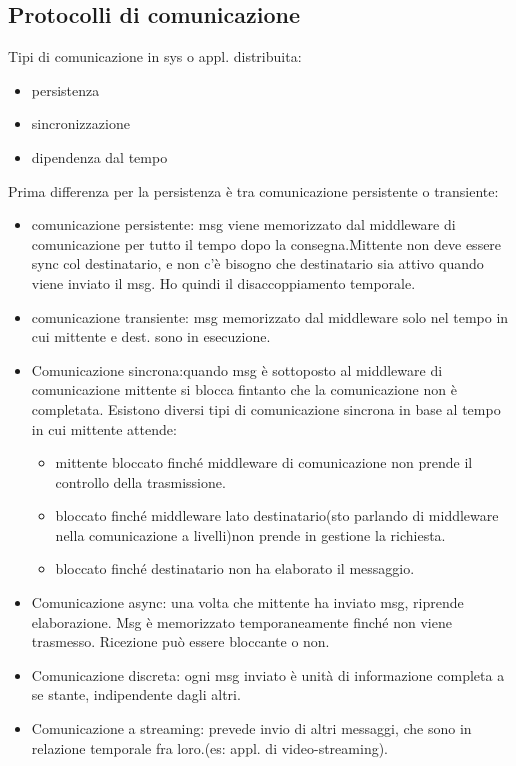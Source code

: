 \documentclass{article}
\begin{document}
\subsection{Protocolli di comunicazione}
Tipi di comunicazione in sys o appl. distribuita:
\begin{itemize}
\item persistenza
\item sincronizzazione
\item dipendenza dal tempo
\end{itemize}
Prima differenza per la persistenza è tra comunicazione persistente o transiente:
\begin{itemize}
\item comunicazione persistente: msg viene memorizzato dal middleware di comunicazione per tutto il tempo dopo la consegna.Mittente non deve essere sync col destinatario, e non c'è bisogno che destinatario sia attivo quando viene  inviato il msg. Ho quindi il disaccoppiamento temporale.
\item comunicazione transiente: msg memorizzato dal middleware solo nel tempo in cui mittente e dest. sono in esecuzione.
\item Comunicazione sincrona:quando msg è sottoposto al middleware di comunicazione mittente si blocca fintanto che la comunicazione non è completata. Esistono diversi tipi di comunicazione sincrona in base al tempo in cui mittente attende:
\begin{itemize}
\item mittente bloccato finché middleware di comunicazione non prende il controllo della trasmissione.
\item bloccato finché middleware lato destinatario(sto parlando di middleware nella comunicazione a livelli)non prende in gestione la richiesta.
\item bloccato finché destinatario non ha elaborato il messaggio.
\end{itemize}
\item Comunicazione async: una volta che mittente ha inviato msg, riprende elaborazione. Msg è memorizzato temporaneamente finché non viene trasmesso. Ricezione può essere bloccante o non.
\item Comunicazione discreta: ogni msg inviato è unità di informazione completa a se stante, indipendente dagli altri.
\item Comunicazione a streaming: prevede invio di altri messaggi, che sono in relazione temporale fra loro.(es: appl. di video-streaming).
\end{itemize}
\end{document}

